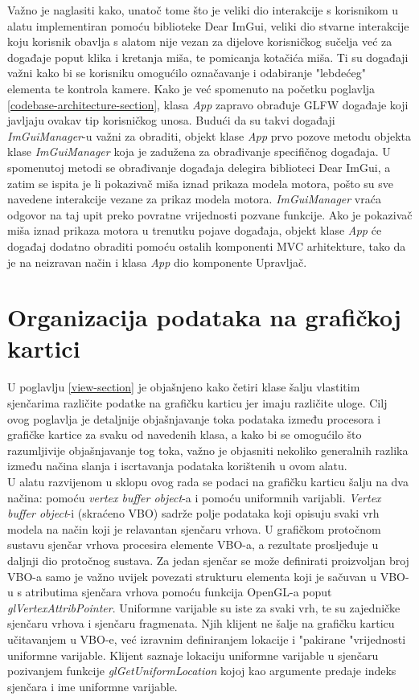 \documentclass[times, utf8, diplomski]{fer}
\begin{document}
Važno je naglasiti kako, unatoč tome što je veliki dio interakcije s korisnikom u alatu implementiran pomoću biblioteke Dear ImGui, veliki dio stvarne interakcije koju korisnik obavlja s alatom nije vezan za dijelove korisničkog sučelja već za događaje poput klika i kretanja miša, te pomicanja kotačića miša. Ti su događaji važni kako bi se korisniku omogućilo označavanje i odabiranje "lebdećeg" elementa te kontrola kamere. Kako je već spomenuto na početku poglavlja \ref{codebase-architecture-section}, klasa \textit{App} zapravo obrađuje GLFW događaje koji javljaju ovakav tip korisničkog unosa. Budući da su takvi događaji \textit{ImGuiManager}-u važni za obraditi, objekt klase \textit{App} prvo pozove metodu objekta klase \textit{ImGuiManager} koja je zadužena za obrađivanje specifičnog događaja. U spomenutoj metodi se obrađivanje događaja delegira biblioteci Dear ImGui, a zatim se ispita je li pokazivač miša iznad prikaza modela motora, pošto su sve navedene interakcije vezane za prikaz modela motora. \textit{ImGuiManager} vraća odgovor na taj upit preko povratne vrijednosti pozvane funkcije. Ako je pokazivač miša iznad prikaza motora u trenutku pojave događaja, objekt klase \textit{App} će događaj dodatno obraditi pomoću ostalih komponenti MVC arhitekture, tako da je na neizravan način i klasa \textit{App} dio komponente Upravljač.


\section{Organizacija podataka na grafičkoj kartici} \label{graphics-card-data-section}

U poglavlju \ref{view-section} je objašnjeno kako četiri klase šalju vlastitim sjenčarima različite podatke na grafičku karticu jer imaju različite uloge. Cilj ovog poglavlja je detaljnije objašnjavanje toka podataka između procesora i grafičke kartice za svaku od navedenih klasa, a kako bi se omogućilo što razumljivije objašnjavanje tog toka, važno je objasniti nekoliko generalnih razlika između načina slanja i iscrtavanja podataka korištenih u ovom alatu.\\

U alatu razvijenom u sklopu ovog rada se podaci na grafičku karticu šalju na dva načina: pomoću  \textit{vertex buffer object}-a i pomoću uniformnih varijabli. \textit{Vertex buffer object}-i (skraćeno VBO) sadrže polje podataka koji opisuju svaki vrh modela na način koji je relavantan sjenčaru vrhova. U grafičkom protočnom sustavu sjenčar vrhova procesira elemente VBO-a, a rezultate prosljeđuje u daljnji dio protočnog sustava. Za jedan sjenčar se može definirati proizvoljan broj VBO-a samo je važno uvijek povezati strukturu elementa koji je sačuvan u VBO-u s atributima sjenčara vrhova pomoću funkcija OpenGL-a poput \textit{glVertexAttribPointer}. Uniformne varijable su iste za svaki vrh, te su zajedničke sjenčaru vrhova i sjenčaru fragmenata. Njih klijent ne šalje na grafičku karticu učitavanjem u VBO-e, već izravnim definiranjem lokacije i "pakirane "vrijednosti uniformne varijable. Klijent saznaje lokaciju uniformne varijable u sjenčaru pozivanjem funkcije \textit{glGetUniformLocation} kojoj kao argumente predaje indeks sjenčara i ime uniformne varijable.\\
\end{document}
